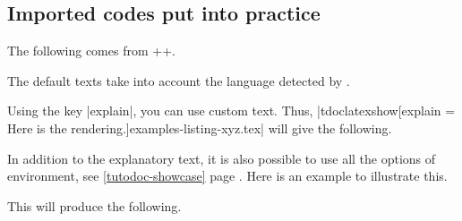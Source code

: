 \documentclass{tutodoc}
\begin{document}


\subsection{Imported codes put into practice}
\label{tutodoc-latexshow}

\begin{tdocexa}[Showcase]
    The following comes from \tdoclatexin++.

    \medskip

    \begin{tdocshowcaseDOC}
    \end{tdocshowcaseDOC}
\end{tdocexa}


\begin{tdocnote}
    The default texts take into account the language detected by \thisproj.
\end{tdocnote}




\begin{tdocexa}
    Using the key \tdoclatexin|explain|, you can use custom text. Thus, \tdoclatexin|tdoclatexshow[explain = Here is the rendering.]{examples-listing-xyz.tex}| will give the following.

    \medskip

    \begin{tdocshowcaseDOC}
    \end{tdocshowcaseDOC}
\end{tdocexa}




\begin{tdocexa}
    In addition to the explanatory text, it is also possible to use all the options of  environment, see \ref{tutodoc-showcase} page \pageref{tutodoc-showcase}.
    Here is an example to illustrate this.

    \medskip


    \medskip

    This will produce the following.

    \medskip

    \begin{tdocshowcaseDOC}
        
    \end{tdocshowcaseDOC}
\end{tdocexa}
\end{document}
